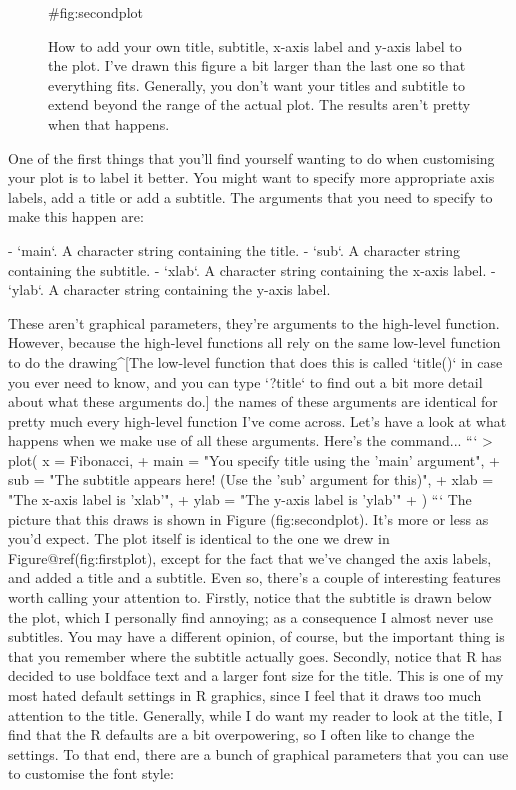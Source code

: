 \begin{figure}[t]
\begin{center}
\caption{How to add your own title, subtitle, x-axis label and y-axis label to the plot. I've drawn this figure a bit larger than the last one so that everything fits. Generally, you don't want your titles and subtitle to extend beyond the range of the actual plot. The results aren't pretty when that happens.}
\HR
{#fig:secondplot}
\end{center}
\end{figure}

One of the first things that you'll find yourself wanting to do when customising your plot is to label it better. You might want to specify more appropriate axis labels, add a title or add a subtitle. The arguments that you need to specify to make this happen are:
 
- `main`. A character string containing the title.
- `sub`. A character string containing the subtitle.
- `xlab`. A character string containing the x-axis label.
- `ylab`. A character string containing the y-axis label.

These aren't graphical parameters, they're arguments to the high-level function. However, because the high-level functions all rely on the same low-level function to do the drawing^[The low-level function that does this is called `title()` in case you ever need to know, and you can type `?title` to find out a bit more detail about what these arguments do.] the names of these arguments are identical for pretty much every high-level function I've come across. Let's have a look at what happens when we make use of all these arguments. Here's the command...
```
> plot( x = Fibonacci, 
+       main = "You specify title using the 'main' argument",
+       sub = "The subtitle appears here! (Use the 'sub' argument for this)",
+       xlab = "The x-axis label is 'xlab'",
+       ylab = "The y-axis label is 'ylab'"
+ )
```
The picture that this draws is shown in Figure \@ref(fig:secondplot). It's more or less as you'd expect. The plot itself is identical to the one we drew in Figure@ref(fig:firstplot), except for the fact that we've changed the axis labels, and added a title and a subtitle. Even so, there's a couple of interesting features worth calling your attention to. Firstly, notice that the subtitle is drawn below the plot, which I personally find annoying; as a consequence I almost never use subtitles. You may have a different opinion, of course, but the important thing is that you remember where the subtitle actually goes.  Secondly, notice that R has decided to use boldface text and a larger font size for the title. This is one of my most hated default settings in R graphics, since I feel that it draws too much attention to the title. Generally, while I do want my reader to look at the title, I find that the R defaults are a bit overpowering, so I often like to change the settings. To that end, there are a bunch of graphical parameters that you can use to customise the font style:
 
